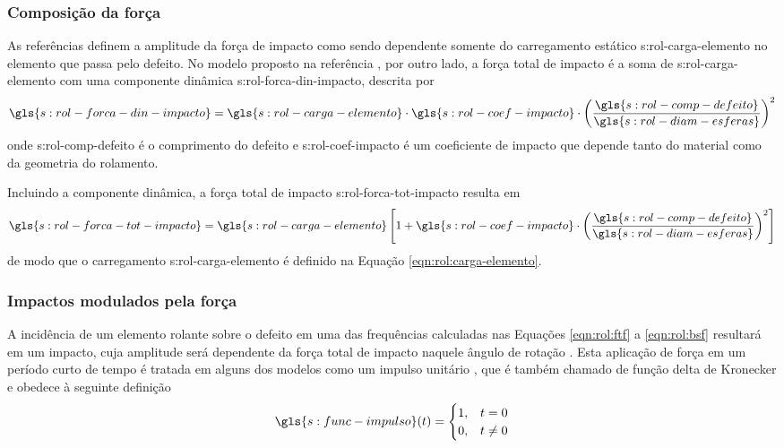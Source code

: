 \documentclass[12pt,oneside,english,brazil,lmodern,siglas,simbolos,cite=num]{ucsmonograph}
\begin{document}
	\subsubsection{Composição da força}
	As referências \cite{mcfadden:1984,tandon:1997} definem a amplitude da força de impacto como sendo dependente somente do carregamento estático \gls{s:rol-carga-elemento} no elemento que passa pelo defeito.
	No modelo proposto na referência \cite{sassi:2007}, por outro lado, a força total de impacto é a soma de \gls{s:rol-carga-elemento} com uma componente dinâmica \gls{s:rol-forca-din-impacto}, descrita por
	\begin{equation}
		\gls{s:rol-forca-din-impacto} =
		\gls{s:rol-carga-elemento}\cdot\gls{s:rol-coef-impacto}\cdot
		\left(\frac{\gls{s:rol-comp-defeito}}
		{\gls{s:rol-diam-esferas}}\right)^2
	\end{equation}
	onde \gls{s:rol-comp-defeito} é o comprimento do defeito e \gls{s:rol-coef-impacto} é um coeficiente de impacto que depende tanto do material como da geometria do rolamento.
	
	Incluindo a componente dinâmica, a força total de impacto \gls{s:rol-forca-tot-impacto} resulta em
	\begin{equation} \label{eqn:rol:forca-impacto-tot}
		\gls{s:rol-forca-tot-impacto} = \gls{s:rol-carga-elemento}
		\left[1 + \gls{s:rol-coef-impacto}\cdot
		\left(\frac{\gls{s:rol-comp-defeito}}
		{\gls{s:rol-diam-esferas}}\right)^2 \right]
	\end{equation}
	de modo que o carregamento \gls{s:rol-carga-elemento} é definido na Equação \ref{eqn:rol:carga-elemento}.
	
	\subsubsection{Impactos modulados pela força}
	A incidência de um elemento rolante sobre o defeito em uma das frequências calculadas nas Equações \ref{eqn:rol:ftf} a \ref{eqn:rol:bsf} resultará em um impacto, cuja amplitude será dependente da força total de impacto naquele ângulo de rotação \cite{mcfadden:1984}.
	Esta aplicação de força em um período curto de tempo é tratada em alguns dos modelos como um impulso unitário \cite{mcfadden:1984,sassi:2007,cong:2013}, que é também chamado de função delta de Kronecker e obedece à seguinte definição \cite{rao:2008}
	\begin{equation} \label{eqn:delta-kron}
		\gls{s:func-impulso}(t) = 
		\begin{cases}
			1,& t=0\\
			0,& t\ne 0
		\end{cases}
	\end{equation}
	
\end{document}
